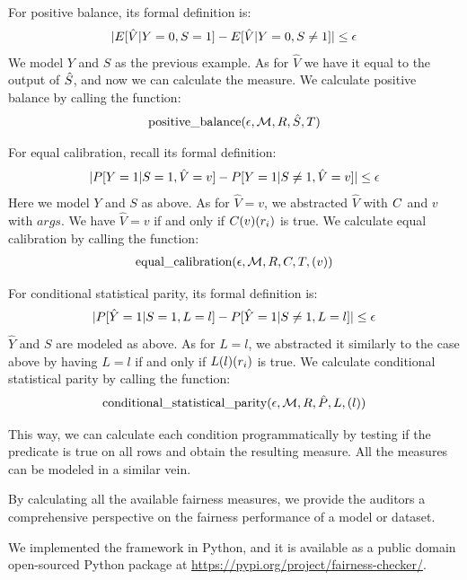 \documentclass[conference]{IEEEtran}
\begin{document}
For positive balance, its formal definition is:
\begin{align*}
    \lvert E[\hat{V} | Y = 0, S = 1] - E[\hat{V} | Y = 0, S \neq 1]\rvert \leq \epsilon
\end{align*}
We model $Y$ and $S$ as the previous example. As for $\hat{V}$ we have it equal to the output of $\hat{S}$, and now we can calculate the measure. We calculate positive balance by calling the function:
\begin{align*}
    \text{positive\_balance} (\epsilon, \mathcal{M}, R, \hat{S}, T)
\end{align*}

For equal calibration, recall its formal definition:
\begin{align*}
    \lvert P[Y = 1 | S = 1, \hat{V} = v] - P[Y = 1 | S \neq 1, \hat{V} = v]\rvert \leq \epsilon
\end{align*}
Here we model $Y$ and $S$ as above. As for $\hat{V} = v$, we abstracted $\hat{V}$ with $C$ and $v$ with $args$. We have $\hat{V} = v$ if and only if $C(v)(r_i)$ is true. We calculate equal calibration by calling the function:
\begin{align*}
    \text{equal\_calibration} (\epsilon, \mathcal{M}, R, C, T, (v))
\end{align*}

For conditional statistical parity, its formal definition is:
\[
    \lvert P[\hat{Y} = 1 | S = 1, L = l] - P[\hat{Y} = 1 | S \neq 1, L = l]\rvert \leq \epsilon
\]
$\hat{Y}$ and $S$ are modeled as above. As for $L = l$, we abstracted it similarly to the case above by having $L = l$ if and only if $L(l)(r_i)$ is true. We calculate conditional statistical parity by calling the function:
\begin{align*}
    \text{conditional\_statistical\_parity} (\epsilon, \mathcal{M}, R, \hat{P}, L, (l))
\end{align*}

This way, we can calculate each condition programmatically by testing if the predicate is true on all rows and obtain the resulting measure. All the measures can be modeled in a similar vein.

By calculating all the available fairness measures, we provide the auditors a comprehensive perspective on the fairness performance of a model or dataset.

We implemented the framework in Python, and it is available as a public domain open-sourced Python package at \url{https://pypi.org/project/fairness-checker/}.
\end{document}
